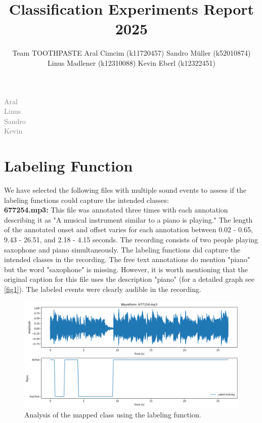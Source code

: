 \documentclass{article}
\title{Classification Experiments Report 2025}
\author{%
  Team TOOTHPASTE \AND
  Aral Cimcim (k11720457)
  \And
  Sandro Müller (k52010874)
  \And 
  Linus Madlener (k12310088)
  \And 
  Kevin Eberl (k12322451)
}
\begin{document}
\maketitle

\begin{contributions}
    \textcolor{gray}{
    Aral \\
    Linus \\
    Sandro \\
    Kevin \\
    }
  
\end{contributions}

\section{Labeling Function}
We have selected the following files with multiple sound events to assess if the labeling functions could capture the intended classes:
\\

\textbf{677254.mp3:}
This file was annotated three times with each annotation describing it as "A musical instrument similar to a piano is playing." The length of the annotated onset and offset varies for each annotation between 0.02 - 0.65, 9.43 - 26.51, and 2.18 - 4.15 seconds. The recording consists of two people playing saxophone and piano simultaneously. The labeling functions did capture the intended classes in the recording. The free text annotations do mention "piano" but the word "saxophone" is missing. However, it is worth mentioning that the original caption for this file uses the description "piano" (for a detailed graph see \autoref{fig1}). The labeled events were clearly audible in the recording.

\begin{figure}[H]
  \centering
  \includegraphics[width=0.75\linewidth]{output1.png}
  \caption{Analysis of the mapped class using the labeling function.}
  \label{fig1}
\end{figure}
\pagebreak
\end{document}
